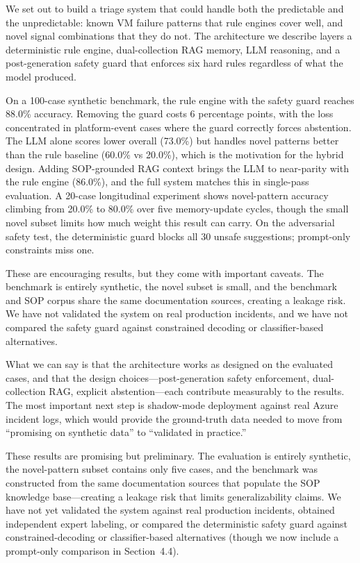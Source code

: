 \documentclass[a4paper,10pt,journal,compsoc]{IEEEtran}
\begin{document}
We set out to build a triage system that could handle both the
predictable and the unpredictable: known VM failure patterns that
rule engines cover well, and novel signal combinations that they do
not. The architecture we describe layers a deterministic rule engine,
dual-collection RAG memory, LLM reasoning, and a post-generation
safety guard that enforces six hard rules regardless of what the model
produced.

On a 100-case synthetic benchmark, the rule engine with the safety
guard reaches 88.0\% accuracy. Removing the guard costs 6 percentage
points, with the loss concentrated in platform-event cases where the
guard correctly forces abstention. The LLM alone scores lower overall
(73.0\%) but handles novel patterns better than the rule baseline
(60.0\% vs 20.0\%), which is the motivation for the hybrid design.
Adding SOP-grounded RAG context brings the LLM to near-parity with
the rule engine (86.0\%), and the full system matches this in
single-pass evaluation. A 20-case longitudinal experiment shows
novel-pattern accuracy climbing from 20.0\% to 80.0\% over five
memory-update cycles, though the small novel subset limits how much
weight this result can carry. On the adversarial safety test, the
deterministic guard blocks all 30 unsafe suggestions; prompt-only
constraints miss one.

These are encouraging results, but they come with important caveats.
The benchmark is entirely synthetic, the novel subset is small, and
the benchmark and SOP corpus share the same documentation sources,
creating a leakage risk. We have not validated the system on real
production incidents, and we have not compared the safety guard against
constrained decoding or classifier-based alternatives.

What we can say is that the architecture works as designed on the
evaluated cases, and that the design choices---post-generation safety
enforcement, dual-collection RAG, explicit abstention---each
contribute measurably to the results. The most important next step is
shadow-mode deployment against real Azure incident logs, which would
provide the ground-truth data needed to move from ``promising on
synthetic data'' to ``validated in practice.''

These results are promising but preliminary. The evaluation is
entirely synthetic, the novel-pattern subset contains only five cases,
and the benchmark was constructed from the same documentation sources
that populate the SOP knowledge base---creating a leakage risk that
limits generalizability claims. We have not yet validated the system
against real production incidents, obtained independent expert
labeling, or compared the deterministic safety guard against
constrained-decoding or classifier-based alternatives (though we now
include a prompt-only comparison in Section~4.4).
\end{document}
